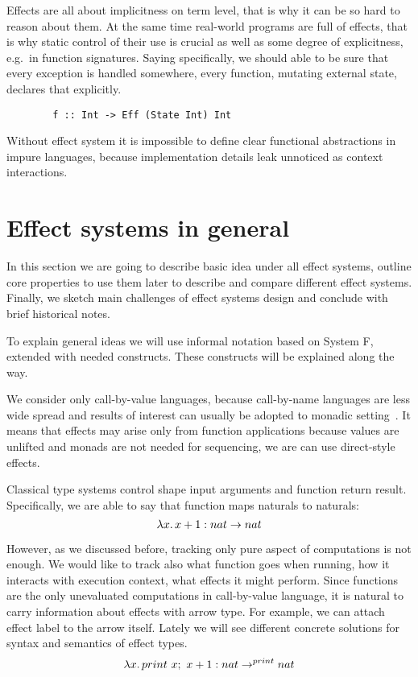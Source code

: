 \documentclass[conference]{IEEEtran}
\newcommand{\seq}{;~}
\newcommand{\ap}{~}
\begin{document}

    Effects are all about implicitness on term level, that is why it can be so hard to reason about them.
    At the same time real-world programs are full of effects, that is why static control of their use is crucial as well as some degree of explicitness, e.g.\ in function signatures.
    Saying specifically, we should able to be sure that every exception is handled somewhere, every function, mutating external state, declares that explicitly.

    \begin{verbatim}
        f :: Int -> Eff (State Int) Int
    \end{verbatim}

    Without effect system it is impossible to define clear functional abstractions in impure languages, because implementation details leak unnoticed as context interactions.


    \section{Effect systems in general}

    In this section we are going to describe basic idea under all effect systems, outline core properties to use them later to describe and compare different effect systems.
    Finally, we sketch main challenges of effect systems design and conclude with brief historical notes.

    To explain general ideas we will use informal notation based on System F, extended with needed constructs.
    These constructs will be explained along the way.

    We consider only call-by-value languages, because call-by-name languages are less wide spread and results of interest can usually be adopted to monadic setting~\cite{wadler2003marriage}.
    It means that effects may arise only from function applications because values are unlifted and monads are not needed for sequencing, we are can use direct-style effects.

    Classical type systems control shape input arguments and function return result.
    Specifically, we are able to say that function maps naturals to naturals:
    \[\lambda x\ldotp x + 1 : nat\to nat\]

    However, as we discussed before, tracking only pure aspect of computations is not enough.
    We would like to track also what function goes when running, how it interacts with execution context, what effects it might perform.
    Since functions are the only unevaluated computations in call-by-value language, it is natural to carry information about effects with arrow type.
    For example, we can attach effect label to the arrow itself.
    Lately we will see different concrete solutions for syntax and semantics of effect types.
    \[\lambda x\ldotp print \ap x\seq x + 1 : nat\to^{print} nat\]
\end{document}
